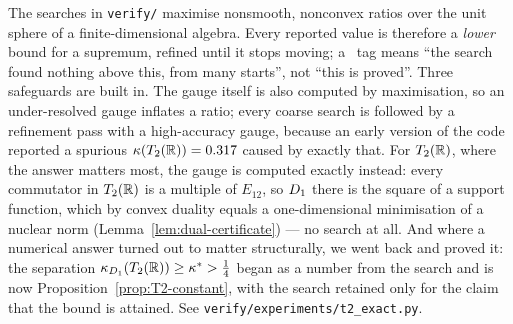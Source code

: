 The searches in \texttt{verify/} maximise nonsmooth, nonconvex ratios over the
unit sphere of a finite-dimensional algebra.  Every reported value is therefore
a \emph{lower} bound for a supremum, refined until it stops moving; a
\statusnum\ tag means ``the search found nothing above this, from many
starts'', not ``this is proved''.  Three safeguards are built in.  The gauge
itself is also computed by maximisation, so an under-resolved gauge inflates a
ratio; every coarse search is followed by a refinement pass with a high-accuracy
gauge, because an early version of the code reported a spurious
$\kappa(T_2(\mathbb{R}))=0.317$ caused by exactly that.  For $T_2(\mathbb{R})$, where the
answer matters most, the gauge is computed exactly instead: every commutator in
$T_2(\mathbb{R})$ is a multiple of $E_{12}$, so $D_1$ there is the square of a
support function, which by convex duality equals a one-dimensional minimisation
of a nuclear norm (Lemma~\ref{lem:dual-certificate}) --- no search at all.  And
where a numerical answer turned out to matter structurally, we went back and
proved it: the separation $\kappa_{D_1}(T_2(\mathbb{R}))\ge\kappa^*>\tfrac14$ began as
a number from the search and is now Proposition~\ref{prop:T2-constant}, with the
search retained only for the claim that the bound is attained.
See \texttt{verify/experiments/t2\_exact.py}.
